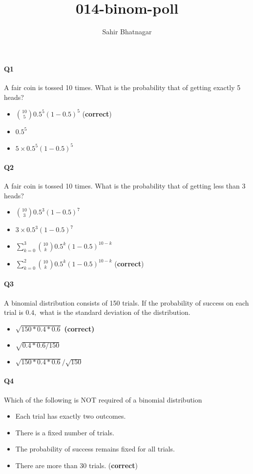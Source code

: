 \documentclass[12pt,letter]{article}
\title{014-binom-poll}
\author{Sahir Bhatnagar}
\begin{document}
\maketitle
\pagestyle{fancy}


\paragraph{Q1}

A fair coin is tossed 10 times. What is the probability that of getting exactly 5 heads?
\begin{itemize}
\item $\binom{10}{5} 0.5^5 (1-0.5)^5$ (\textbf{correct})
\item  $0.5^5$
\item  $5 \times 0.5^5 (1-0.5)^5$
\end{itemize}


\paragraph{Q2}
A fair coin is tossed 10 times. What is the probability that of getting less than 3 heads?
\begin{itemize}
	\item $\binom{10}{3} 0.5^3 (1-0.5)^7$ 
		\item $3 \times 0.5^3 (1-0.5)^7$
			\item $\sum_{k=0}^{3}\binom{10}{k} 0.5^k (1-0.5)^{10-k}$
	\item $\sum_{k=0}^{2}\binom{10}{k} 0.5^k (1-0.5)^{10-k}$ (\textbf{correct})
\end{itemize}

\paragraph{Q3}
A binomial distribution consists of 150 trials. If the probability of success on each trial is $0.4,$ what is the standard deviation of the distribution.
\begin{itemize}
	\item $\sqrt{150*0.4*0.6}$ \textbf{(correct)}
	\item $\sqrt{0.4*0.6 / 150}$
	\item $\sqrt{150*0.4*0.6}/\sqrt{150}$
\end{itemize}



\paragraph{Q4}
Which of the following is NOT required of a binomial distribution
\begin{itemize}
	\item Each trial has exactly two outcomes.
\item  There is a fixed number of trials.
\item The probability of success remains fixed for all trials.
\item There are more than 30 trials. (\textbf{correct})
\end{itemize}
\end{document}

